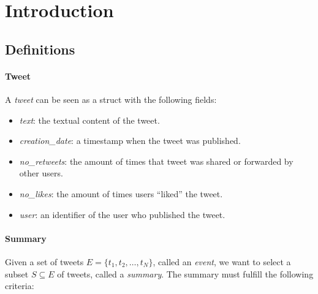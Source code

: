 \documentclass[12pt]{article}
\begin{document}
\maketitle

\begin{abstract}

\end{abstract}

\section{Introduction}


\subsection{Definitions}

\paragraph{Tweet}
A {\em tweet} can be seen as a struct with the following fields:

\begin{itemize}
\item {\em text}: the textual content of the tweet.
\item {\em creation\_date}: a timestamp when the tweet was published.
\item {\em no\_retweets}: the amount of times that tweet was shared or
      forwarded by other users.
\item {\em no\_likes}: the amount of times users ``liked'' the tweet.
\item {\em user}: an identifier of the user who published the tweet.
\end{itemize}


\paragraph{Summary}
Given a set of tweets $E = \{t_1, t_2, \ldots, t_N\}$, called an {\em
  event}, we want to select a subset $S \subseteq E$ of tweets, called
  a {\em summary}. The summary must fulfill the following criteria:
\end{document}

